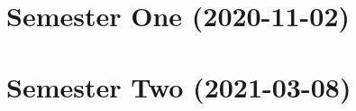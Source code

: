\documentclass[a4paper]{report}
\begin{document}
\tableofcontents
\part{Semester One (2020-11-02)}


\part{Semester Two (2021-03-08)}


\end{document}
